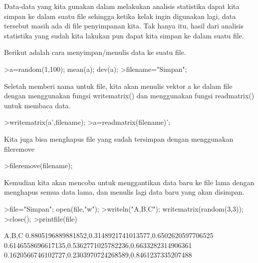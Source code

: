 \documentclass[a4paper,10pt]{article}
\begin{document}
\begin{eulernotebook}
\begin{eulercomment}
\begin{eulercomment}
\begin{eulercomment}
\begin{eulercomment}
\begin{eulercomment}
\begin{eulercomment}
\begin{eulercomment}
\begin{eulercomment}
\begin{eulercomment}
\begin{eulercomment}
\begin{eulercomment}
\begin{eulercomment}
\begin{eulercomment}
\end{eulercomment}
\begin{eulercomment}
Data-data yang kita gunakan dalam melakukan analisis statistika dapat
kita simpan ke dalam suatu file sehingga ketika kelak ingin digunakan
lagi, data tersebut masih ada di file penyimpanan kita. Tak hanya itu,
hasil dari analisis statistika yang sudah kita lakukan pun dapat kita
simpan ke dalam suatu file.

Berikut adalah cara menyimpan/menulis data ke suatu file.
\end{eulercomment}
\begin{eulerprompt}
>a=random(1,100); mean(a); dev(a);
>filename="Simpan";
\end{eulerprompt}
\begin{eulercomment}
Seletah memberi nama untuk file, kita akan menulis vektor a ke dalam
file dengan menggunakan fungsi writematrix() dan menggunakan fungsi
readmatrix() untuk membaca data.
\end{eulercomment}
\begin{eulerprompt}
>writematrix(a',filename);
>a=readmatrix(filename)';
\end{eulerprompt}
\begin{eulercomment}
Kita juga bisa menghapus file yang sudah tersimpan dengan menggunakan
fileremove
\end{eulercomment}
\begin{eulerprompt}
>fileremove(filename);
\end{eulerprompt}
\begin{eulercomment}
Kemudian kita akan mencoba untuk menggantikan data baru ke file lama
dengan menghapus semua data lama, dan menulis lagi data baru yang akan
disimpan.
\end{eulercomment}
\begin{eulerprompt}
>file="Simpan"; open(file,"w");
>writeln("A,B,C"); writematrix(random(3,3));
>close();
>printfile(file)
\end{eulerprompt}
\begin{euleroutput}
  A,B,C
  0.8805196889881852,0.3148921741013577,0.6502620597706525
  0.6146558696617135,0.5362771025782236,0.6633282314906361
  0.1620566746102727,0.2303970724268589,0.8461237335207488
  

\end{euleroutput}
\end{eulercomment}
\end{eulercomment}
\end{eulercomment}
\end{eulercomment}
\end{eulercomment}
\end{eulercomment}
\end{eulercomment}
\end{eulercomment}
\end{eulercomment}
\end{eulercomment}
\end{eulercomment}
\end{eulercomment}
\end{eulernotebook}
\end{document}

